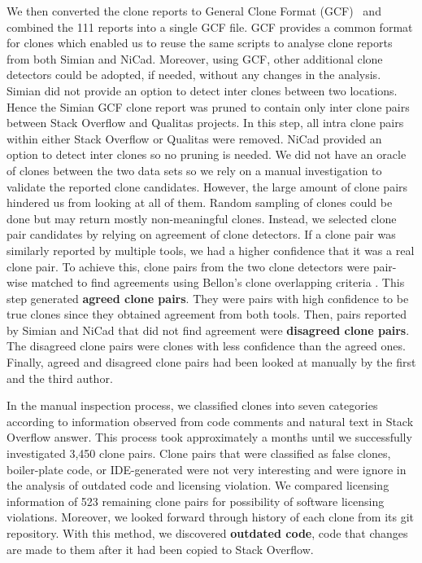 \documentclass{sig-alternate-05-2015}
\begin{document}
We then converted the clone reports to General Clone Format (GCF)~\cite{Wang2013} and combined the 111 reports into a single GCF file. GCF provides a common format for clones which enabled us to reuse the same scripts to analyse clone reports from both Simian and NiCad. Moreover, using GCF, other additional clone detectors could be adopted, if needed, without any changes in the analysis. Simian did not provide an option to detect inter clones between two locations. Hence the Simian GCF clone report was pruned to contain only inter clone pairs between Stack Overflow and Qualitas projects. In this step, all intra clone pairs within either Stack Overflow or Qualitas were removed. NiCad provided an option to detect inter clones so no pruning is needed. We did not have an oracle of clones between the two data sets so we rely on a manual investigation to validate the reported clone candidates. However, the large amount of clone pairs hindered us from looking at all of them. Random sampling of clones could be done but may return mostly non-meaningful clones. Instead, we selected clone pair candidates by relying on agreement of clone detectors. If a clone pair was similarly reported by multiple tools, we had a higher confidence that it was a real clone pair. To achieve this, clone pairs from the two clone detectors were pair-wise matched to find agreements using Bellon's clone overlapping criteria \cite{Bellon2007}. This step generated \textbf{agreed clone pairs}. They were pairs with high confidence to be true clones since they obtained agreement from both tools. Then, pairs reported by Simian and NiCad that did not find agreement were \textbf{disagreed clone pairs}. The disagreed clone pairs were clones with less confidence than the agreed ones. Finally, agreed and disagreed clone pairs had been looked at manually by the first and the third author.

In the manual inspection process, we classified clones into seven categories according to information observed from code comments and natural text in Stack Overflow answer. This process took approximately a months until we successfully investigated 3,450 clone pairs. Clone pairs that were classified as false clones, boiler-plate code, or IDE-generated were not very interesting and were ignore in the analysis of outdated code and licensing violation. 
We compared licensing information of 523 remaining clone pairs for possibility of software licensing violations. Moreover, we looked forward through history of each clone from its git repository. With this method, we discovered \textbf{outdated code}, code that changes are made to them after it had been copied to Stack Overflow. %
\end{document}

